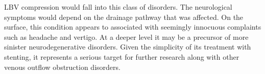 \documentclass{article}
\begin{document}
LBV compression would fall into this class of disorders. The neurological symptoms would depend on the drainage pathway that was affected.
On the surface, this condition  appears to associated with seemingly innocuous complaints such as headache and vertigo.
At a deeper level it may be a precursor of more sinister neurodegenerative disorders.
Given the simplicity of its treatment with stenting, it represents a serious target for further research along with other venous outflow obstruction disorders.
\end{document}
